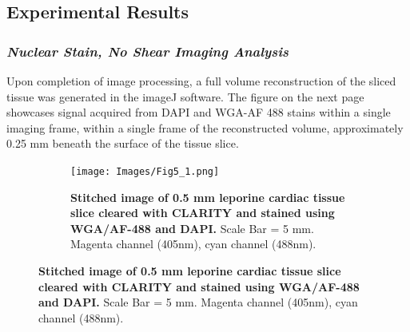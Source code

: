 \subsection{Experimental Results}
\subsubsection{\textit{Nuclear Stain, No Shear Imaging Analysis}}

Upon completion of image processing, a full volume reconstruction of the sliced tissue was generated in the imageJ software. The figure on the next page showcases signal acquired from DAPI and WGA-AF 488 stains within a single imaging frame, within a single frame of the reconstructed volume, approximately 0.25 mm beneath the surface of the tissue slice.

\begin{figure}[H]
\centering
\begin{subfigure}[t]{0.9\textwidth}
\texttt{[image: Images/Fig5\_1.png]}
\caption{\textbf{Stitched image of 0.5 mm leporine cardiac tissue slice cleared with CLARITY and stained using WGA/AF-488 and DAPI.} Scale Bar = 5 mm. Magenta channel (405nm), cyan channel (488nm).}
\end{subfigure}
\medskip


\end{figure}
